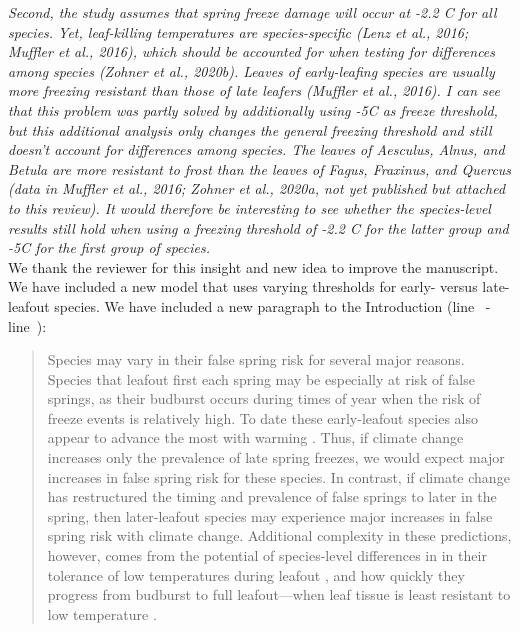 \documentclass[11pt,a4paper]{article}\usepackage[]{graphicx}\usepackage[]{color}
\newcommand{\lr}[1]{line~\lineref{#1}}
\begin{document}
\newpage
\textit{Second, the study assumes that spring freeze damage will occur at -2.2 C for all species. Yet, leaf-killing temperatures are species-specific (Lenz et al., 2016; Muffler et al., 2016), which should be accounted for when testing for differences among species (Zohner et al., 2020b). Leaves of early-leafing species are usually more freezing resistant than those of late leafers (Muffler et al., 2016). I can see that this problem was partly solved by additionally using -5C as freeze threshold, but this additional analysis only changes the general freezing threshold and still doesn't account for differences among species. The leaves of Aesculus, Alnus, and Betula are more resistant to frost than the leaves of Fagus, Fraxinus, and Quercus (data in Muffler et al., 2016; Zohner et al., 2020a, not yet published but attached to this review). It would therefore be interesting to see whether the species-level results still hold when using a freezing threshold of -2.2 C for the latter group and -5C for the first group of species.} \\

We thank the reviewer for this insight and new idea to improve the manuscript. We have included a new model that uses varying thresholds for early- versus late-leafout species. We have included a new paragraph to the Introduction (\lr{Z1thresh} - \lr{Z1threshend}): 

\begin{quotation}
\noindent Species may vary in their false spring risk for several major reasons. Species that leafout first each spring may be especially at risk of false springs, as their budburst occurs during times of year when the risk of freeze events is relatively high. To date these early-leafout species also appear to advance the most with warming  \citep{Wolkovich2012}. Thus, if climate change increases only the prevalence of late spring freezes, we would expect major increases in false spring risk for these species. In contrast, if climate change has restructured the timing and prevalence of false springs to later in the spring, then later-leafout species may experience major increases in false spring risk with climate change. Additional complexity in these predictions, however, comes from the potential of species-level differences in in their tolerance of low temperatures during leafout \citep{Lenz2013}, and how quickly they progress from budburst to full leafout---when leaf tissue is least resistant to low temperature \citep{Augspurger2009,Lenz2013,Muffler2016,Zohner2020}.
\end{quotation}
\end{document}
